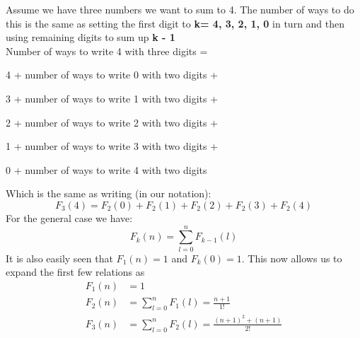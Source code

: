 \documentclass[a4paper]{article}
\begin{document}
\begin{enumerate}[label=(\alph*)]
\begin{enumerate}[label=(\roman*)]
		            Assume we have three numbers we want to sum to 4. The number of ways to do this is the same as setting the first digit to
		            \textbf{k= 4, 3, 2, 1, 0}  in turn and then using remaining digits to sum up \textbf{k - 1}\\
		            Number of ways to write 4 with three digits =\par

		            {4 + {number of ways to write 0 with two digits}} +\par

		            {3 + {number of ways to write 1 with two digits}} +\par

		            {2 + {number of ways to write 2 with two digits}} +\par

		            {1 + {number of ways to write 3 with two digits}} +\par

		            {0 + {number of ways to write 4 with two digits}}\par
		            Which is the same as writing (in our notation):
		            \[F_3(4)=F_2(0)+F_2(1)+F_2(2)+F_2(3)+F_2(4)\]
		            For the general case we have:
		            \[F_k(n) = \sum_{l = 0}^{n}F_{k-1}(l)  \]
		            It is also easily seen that $F_1(n) = 1$ and $F_k(0) = 1$. This now allows us to expand the first few relations as
		            \begin{align*}
			            F_1(n) & =  1                                                         \\
			            F_2(n) & =  \sum_{l = 0}^{n}F_1(l) = \frac{n + 1}{1!}                 \\
			            F_3(n) & =  \sum_{l = 0}^{n}F_2(l) = \frac{{(n + 1)}^2 + (n + 1)}{2!}
		            \end{align*}
	      \end{enumerate}
\end{enumerate}
\end{document}
